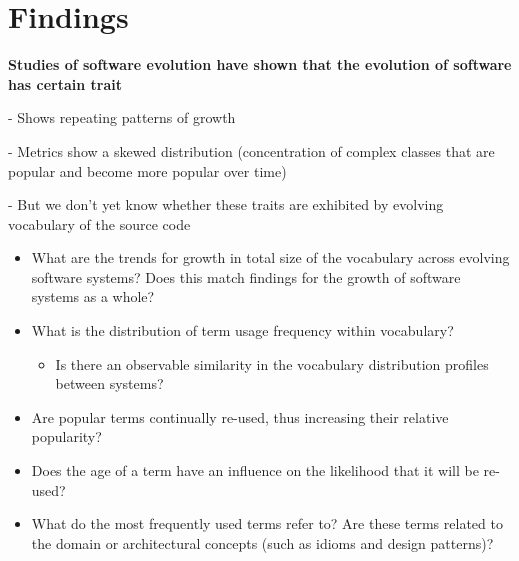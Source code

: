 \chapter{Findings} %
\label{cha:findings}

\excrumbs
{
	\textbf{Studies of software evolution have shown that the evolution of software has certain trait}
	
	- Shows repeating patterns of growth
	
	- Metrics show a skewed distribution (concentration of complex classes that are popular and become more popular over time)
	
	- But we don't yet know whether these traits are exhibited by evolving vocabulary of the source code
}


% 	
% 	
% 	
% 	

\begin{itemize}
	\item What are the trends for growth in total size of the vocabulary across evolving software systems? Does this match findings for the growth of software systems as a whole?
	\item What is the distribution of term usage frequency within vocabulary?
		\begin{itemize}
			\item Is there an observable similarity in the vocabulary distribution profiles between systems?
		\end{itemize}
	\item Are popular terms continually re-used, thus increasing their relative popularity?
	\item Does the age of a term have an influence on the likelihood that it will be re-used?
	\item What do the most frequently used terms refer to? Are these terms related to the domain or architectural concepts (such as idioms and design patterns)?
\end{itemize}

